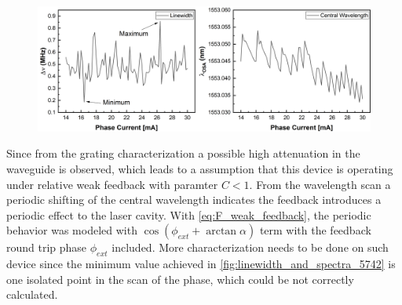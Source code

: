 \begin{figure}[ht]
    \centering
    \includegraphics[width=\linewidth]{figures/linewidth_and_spectra_5742.png}
    \caption{}
    \label{fig:linewidth_and_spectra_5742}
\end{figure}


Since from the grating characterization a possible high attenuation in the waveguide is observed, which leads to a assumption that this device is operating under relative weak feedback with paramter $C<1$. From the wavelength scan a periodic shifting of the central wavelength indicates the feedback introduces a periodic effect to the laser cavity. With \autoref{eq:F_weak_feedback}, the periodic behavior was modeled with $\cos(\phi_{ext}+\arctan\alpha)$ term with the feedback round trip phase $\phi_{ext}$ included. More characterization needs to be done on such device since the minimum value achieved in \autoref{fig:linewidth_and_spectra_5742} is one isolated point in the scan of the phase, which could be not correctly calculated.




